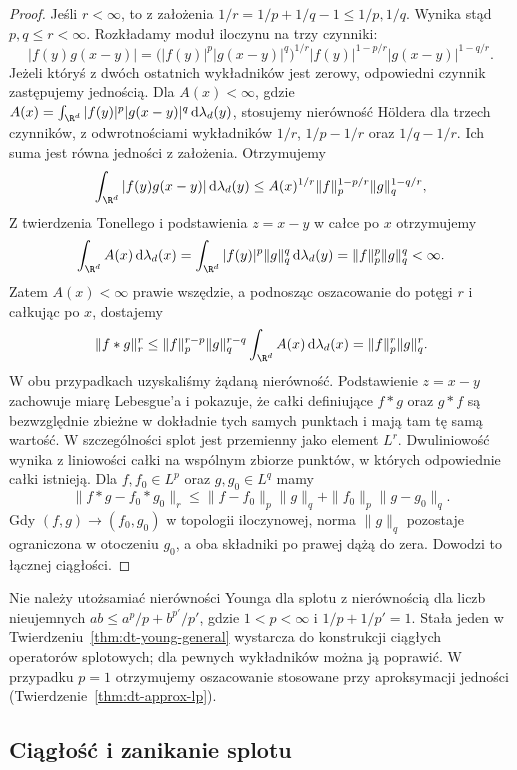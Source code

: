 \begin{proof}
Jeśli $r<\infty$, to z założenia
$1/r=1/p+1/q-1\le 1/p,1/q$. Wynika stąd
$p,q\le r<\infty$. Rozkładamy moduł iloczynu na trzy czynniki:
\[
 |f(y)g(x-y)|
 =\bigl(|f(y)|^p|g(x-y)|^q\bigr)^{1/r}
 |f(y)|^{1-p/r}|g(x-y)|^{1-q/r}.
\]
Jeżeli któryś z dwóch ostatnich wykładników jest zerowy,
odpowiedni czynnik zastępujemy jednością.
Dla $A(x)<\infty$, gdzie
$A(x)=\int_{\R^d}|f(y)|^p|g(x-y)|^q\,\mathrm d\lambda_d(y)$,
stosujemy nierówność Höldera dla trzech czynników,
z odwrotnościami wykładników
$1/r$, $1/p-1/r$ oraz $1/q-1/r$.
Ich suma jest równa jedności z założenia.
Otrzymujemy
\[
 \int_{\R^d}|f(y)g(x-y)|\,\mathrm d\lambda_d(y)
 \le A(x)^{1/r}\|f\|_p^{1-p/r}\|g\|_q^{1-q/r},
\]
Z twierdzenia Tonellego i podstawienia $z=x-y$
w całce po $x$ otrzymujemy
\[
 \int_{\R^d}A(x)\,\mathrm d\lambda_d(x)
 =\int_{\R^d}|f(y)|^p\|g\|_q^q\,\mathrm d\lambda_d(y)
 =\|f\|_p^p\|g\|_q^q<\infty.
\]
Zatem $A(x)<\infty$ prawie wszędzie, a podnosząc
oszacowanie do potęgi $r$ i całkując po $x$, dostajemy
\[
 \|f*g\|_r^r\le
 \|f\|_p^{r-p}\|g\|_q^{r-q}
 \int_{\R^d}A(x)\,\mathrm d\lambda_d(x)
 =\|f\|_p^r\|g\|_q^r.
\]
W obu przypadkach uzyskaliśmy żądaną nierówność.
Podstawienie $z=x-y$ zachowuje miarę Lebesgue'a
i pokazuje, że całki definiujące $f*g$ oraz $g*f$
są bezwzględnie zbieżne w dokładnie tych samych
punktach i mają tam tę samą wartość. W szczególności
splot jest przemienny jako element $L^r$.
Dwuliniowość wynika z liniowości całki na wspólnym
zbiorze punktów, w których odpowiednie całki istnieją.
Dla $f,f_0\in L^p$ oraz $g,g_0\in L^q$ mamy
\[
 \|f*g-f_0*g_0\|_r
 \le\|f-f_0\|_p\|g\|_q+\|f_0\|_p\|g-g_0\|_q.
\]
Gdy $(f,g)\to(f_0,g_0)$ w topologii iloczynowej,
norma $\|g\|_q$ pozostaje ograniczona w otoczeniu $g_0$,
a oba składniki po prawej dążą do zera.
Dowodzi to łącznej ciągłości.
\end{proof}

\begin{uwaga}
\label{rem:dt-young-scope}
Nie należy utożsamiać nierówności Younga dla splotu
z nierównością dla liczb nieujemnych
$ab\le a^p/p+b^{p'}/p'$, gdzie $1<p<\infty$
i $1/p+1/p'=1$.
Stała jeden w Twierdzeniu~\ref{thm:dt-young-general}
wystarcza do konstrukcji ciągłych operatorów splotowych;
dla pewnych wykładników można ją poprawić.
W przypadku $p=1$ otrzymujemy oszacowanie stosowane
przy aproksymacji jedności
(Twierdzenie~\ref{thm:dt-approx-lp}).
\end{uwaga}


\subsection{Ciągłość i zanikanie splotu}

